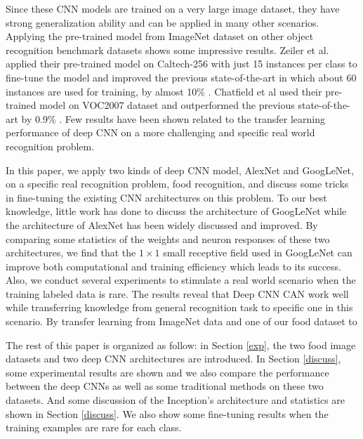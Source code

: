 Since these CNN models are trained on a very large image dataset, they have strong generalization ability and can be applied in many other scenarios. Applying the pre-trained model from ImageNet dataset on other object recognition benchmark datasets shows some impressive results.
Zeiler et al. applied their pre-trained model on Caltech-256 with just 15 instances per class to fine-tune the model and improved the previous state-of-the-art in which about 60 instances are used for training, by almost 10\% \cite{zeiler2014visualizing}.
Chatfield et al used their pre-trained model on VOC2007 dataset and outperformed the previous state-of-the-art by 0.9\% \cite{Chatfield14}.
Few results have been shown related to the transfer learning performance of deep CNN on a more challenging and specific real world recognition problem.

In this paper, we apply two kinds of deep CNN model, AlexNet and GoogLeNet, on a specific real recognition problem, food recognition, and discuss some tricks in fine-tuning the existing CNN architectures on this problem. To our best knowledge, little work has done to discuss the architecture of GoogLeNet while the architecture of AlexNet has been widely discussed and improved. By comparing some statistics of the weights and neuron responses of these two architectures, we find that the $1\times 1$ small receptive field used in GoogLeNet can improve both computational and training efficiency which leads to its success.
Also, we conduct several experiments to stimulate a real world scenario when the training labeled data is rare. The results reveal that Deep CNN CAN work well while transferring knowledge from general recognition task to specific one in this scenario. By transfer learning from ImageNet data and one of our food dataset to 

The rest of this paper is organized as follow: in Section \ref{exp}, the two food image datasets and two deep CNN architectures are introduced. In Section \ref{discuss}, some experimental results are shown and we also compare the performance between the deep CNNs as well as some traditional methods on these two datasets. And some discussion of the Inception's architecture and statistics are shown in Section \ref{discuss}. We also show some fine-tuning results when the training examples are rare for each class.

